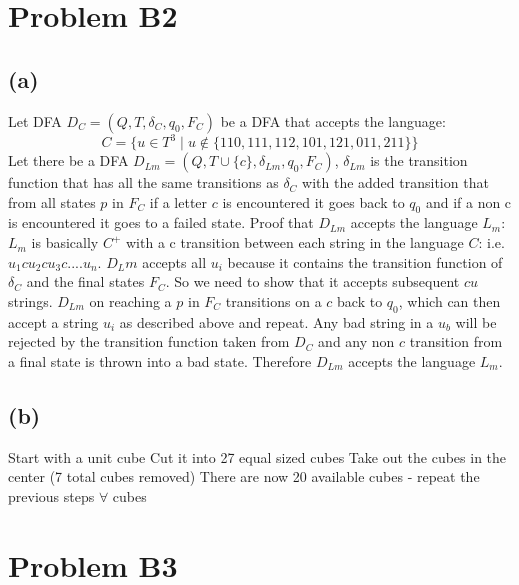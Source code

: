 \documentclass[12pt]{article}
\begin{document}
\section*{Problem B2}
\subsection*{(a)}
Let DFA $D_C = (Q, T, \delta_C, q_0, F_C)$ be a DFA that accepts the language: \[
C = \{u\in T^3 \mid u \notin \{110, 111, 112, 101, 121, 011, 211\}\}
\]Let there be a DFA  $D_{Lm} = (Q, T \cup \{c\}, \delta_{Lm}, q_0, F_C)$, $\delta_{Lm}$ is the transition function that has all the same transitions as $\delta_C$ with the added transition that from all states $p$ in $F_C$ if a letter $c$ is encountered it goes back to $q_0$ and if a non c is encountered it goes to a failed state.\newline\newline
Proof that $D_{Lm}$ accepts the language $L_m$:\newline
\indent$L_m$ is basically $C^+$ with a c transition between each string in the language $C$: i.e. $u_1cu_2cu_3c....u_n$. $D_Lm$ accepts all $u_i$ because it contains the transition function of $\delta_C$ and the final states $F_C$.  So we need to show that it accepts subsequent $cu$ strings.  $D_{Lm}$ on reaching a $p$ in $F_C$ transitions on a $c$ back to $q_0$, which can then accept a string $u_i$ as described above and repeat.  Any bad string in a $u_b$ will be rejected by the transition function taken from $D_C$ and any non $c$ transition from a final state is thrown into a bad state.  Therefore $D_{Lm}$ accepts the language $L_m$. 
\subsection*{(b)}
Start with a unit cube\newline
Cut it into 27 equal sized cubes\newline
Take out the cubes in the center (7 total cubes removed)\newline
There are now 20 available cubes - repeat the previous steps $\forall$ cubes
\section*{Problem B3}
\end{document}
